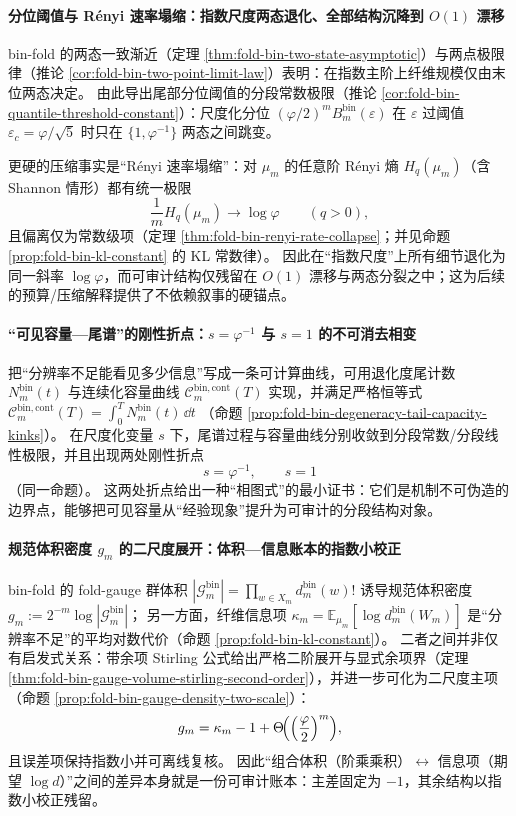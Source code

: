 \paragraph{分位阈值与 R\'enyi 速率塌缩：指数尺度两态退化、全部结构沉降到 \texorpdfstring{$O(1)$}{O(1)} 漂移}
bin-fold 的两态一致渐近（定理 \ref{thm:fold-bin-two-state-asymptotic}）与两点极限律（推论 \ref{cor:fold-bin-two-point-limit-law}）表明：在指数主阶上纤维规模仅由末位两态决定。
由此导出尾部分位阈值的分段常数极限（推论 \ref{cor:fold-bin-quantile-threshold-constant}）：尺度化分位
\(
(\varphi/2)^m B^{\mathrm{bin}}_m(\varepsilon)
\)
在 \(\varepsilon\) 过阈值 \(\varepsilon_c=\varphi/\sqrt5\) 时只在 \(\{1,\varphi^{-1}\}\) 两态之间跳变。
\par
更硬的压缩事实是“R\'enyi 速率塌缩”：对 \(\mu_m\) 的任意阶 R\'enyi 熵 \(H_q(\mu_m)\)（含 Shannon 情形）都有统一极限
\[
\frac{1}{m}H_q(\mu_m)\to\log\varphi
\qquad(q>0),
\]
且偏离仅为常数级项（定理 \ref{thm:fold-bin-renyi-rate-collapse}；并见命题 \ref{prop:fold-bin-kl-constant} 的 KL 常数律）。
因此在“指数尺度”上所有细节退化为同一斜率 \(\log\varphi\)，而可审计结构仅残留在 \(O(1)\) 漂移与两态分裂之中；这为后续的预算/压缩解释提供了不依赖叙事的硬锚点。

\paragraph{“可见容量—尾谱”的刚性折点：\texorpdfstring{$s=\varphi^{-1}$}{s=phi^{-1}} 与 \texorpdfstring{$s=1$}{s=1} 的不可消去相变}
把“分辨率不足能看见多少信息”写成一条可计算曲线，可用退化度尾计数
\(
N^{\mathrm{bin}}_m(t)
\)
与连续化容量曲线
\(
\mathcal{C}^{\mathrm{bin,cont}}_m(T)
\)
实现，并满足严格恒等式
\(
\mathcal{C}^{\mathrm{bin,cont}}_m(T)=\int_0^T N^{\mathrm{bin}}_m(t)\,\dd t
\)
（命题 \ref{prop:fold-bin-degeneracy-tail-capacity-kinks}）。
在尺度化变量 \(s\) 下，尾谱过程与容量曲线分别收敛到分段常数/分段线性极限，并且出现两处刚性折点
\[
s=\varphi^{-1},\qquad s=1
\]
（同一命题）。
这两处折点给出一种“相图式”的最小证书：它们是机制不可伪造的边界点，能够把可见容量从“经验现象”提升为可审计的分段结构对象。

\paragraph{规范体积密度 \texorpdfstring{$g_m$}{gm} 的二尺度展开：体积—信息账本的指数小校正}
bin-fold 的 fold-gauge 群体积
\(
|\mathcal{G}^{\mathrm{bin}}_m|=\prod_{w\in X_m}d_m^{\mathrm{bin}}(w)!
\)
诱导规范体积密度 \(g_m:=2^{-m}\log|\mathcal{G}^{\mathrm{bin}}_m|\)；
另一方面，纤维信息项
\(
\kappa_m=\mathbb{E}_{\mu_m}[\log d_m^{\mathrm{bin}}(W_m)]
\)
是“分辨率不足”的平均对数代价（命题 \ref{prop:fold-bin-kl-constant}）。
二者之间并非仅有启发式关系：带余项 Stirling 公式给出严格二阶展开与显式余项界（定理 \ref{thm:fold-bin-gauge-volume-stirling-second-order}），并进一步可化为二尺度主项（命题 \ref{prop:fold-bin-gauge-density-two-scale}）：
\[
g_m=\kappa_m-1+\Theta\!\Bigl(\Bigl(\frac{\varphi}{2}\Bigr)^m\Bigr),
\]
且误差项保持指数小并可离线复核。
因此“组合体积（阶乘乘积）\(\leftrightarrow\) 信息项（期望 \(\log d\)）”之间的差异本身就是一份可审计账本：主差固定为 \(-1\)，其余结构以指数小校正残留。

